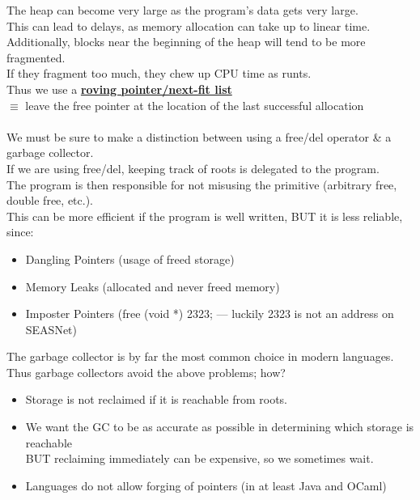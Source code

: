 \documentclass[../../lecture_notes.tex]{subfiles}
\begin{document}
\noindent The heap can become very large as the program’s data gets very large.\\
This can lead to delays, as memory allocation can take up to linear time.\\
Additionally, blocks near the beginning of the heap will tend to be more fragmented.\\
\indent If they fragment too much, they chew up CPU time as runts.\\
Thus we use a \textbf{\underline{roving pointer/next-fit list}}\\
	\indent $\equiv$ leave the free pointer at the location of the last successful allocation\\
\\
We must be sure to make a distinction between using a free/del operator \& a garbage collector.\\
If we are using free/del, keeping track of roots is delegated to the program.\\
The program is then responsible for not misusing the primitive (arbitrary free, double free, etc.).\\
This can be more efficient if the program is well written, BUT it is less reliable, since: \begin{itemize} [itemsep=0mm]
		\item Dangling Pointers (usage of freed storage)
		\item Memory Leaks (allocated and never freed memory)
		\item Imposter Pointers (free (void *) 2323; — luckily 2323 is not an address on SEASNet)
	\end{itemize}
The garbage collector is by far the most common choice in modern languages.\\
Thus garbage collectors avoid the above problems; how? \begin{itemize} [itemsep=0mm]
	\item Storage is not reclaimed if it is reachable from roots.
	\item We want the GC to be as accurate as possible in determining which storage is reachable\\
	        BUT reclaiming immediately can be expensive, so we sometimes wait.
	\item Languages do not allow forging of pointers (in at least Java and OCaml)
\end{itemize} \smallskip
\end{document}
